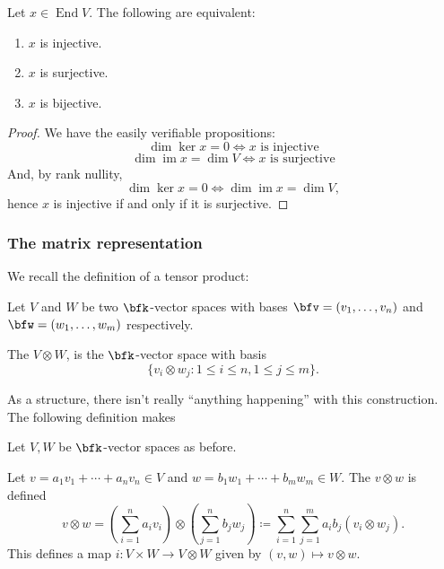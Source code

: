 \documentclass{article}
\DeclareMathOperator{\End}{End}
\DeclareMathOperator{\im}{im}
\begin{document}
\begin{corollary}
    Let $x \in \End V$.
    The following are equivalent:
    \begin{enumerate}[label=(\alph*)]
        \item
            $x$ is injective.
        \item
            $x$ is surjective.
        \item
            $x$ is bijective.
    \end{enumerate}
\end{corollary}

\begin{proof}
    We have the easily verifiable propositions:
    \[
        \dim \ker x = 0 \iff x \text{ is injective}
    \]
    \[
        \dim \im x = \dim V \iff x \text{ is surjective}
    \]
    And, by rank nullity,
    \[
        \dim \ker x = 0
        \iff
        \dim \im x = \dim V,
    \]
    hence $x$ is injective if and only if it is surjective.
\end{proof}

\subsubsection{The matrix representation}

We recall the definition of a tensor product:

\begin{definition}
    Let $V$ and $W$ be two $\bfk$-vector spaces with bases $\bfv = (v_1,\ldots,v_n)$ and $\bfw = (w_1,\ldots,w_m)$ respectively.

    The  $V \otimes W$, is the $\bfk$-vector space with basis
    \[
        \Big\{
            v_i \otimes w_j: 1 \leq i \leq n, 1 \leq j \leq m
        \Big\}.
    \]
\end{definition}

As a structure, there isn't really ``anything happening'' with this construction.
The following definition makes 

\begin{definition}
    Let $V, W$ be $\bfk$-vector spaces as before.

    Let $v = a_1v_1 + \cdots + a_nv_n \in V$ and $w = b_1w_1 + \cdots + b_mw_m \in W$.
    The  $v \otimes w$ is defined 
    \[
        v \otimes w
        =
        \left(
            \sum_{i=1}^n
            a_iv_i
        \right)
        \otimes
        \left(
            \sum_{j=1}^n
            b_jw_j
        \right)
        \coloneq
        \sum_{i=1}^n
        \sum_{j=1}^m
        a_ib_j (v_i \otimes w_j).
    \]
    This defines a map $i: V \times W \to V \otimes W$ given by $(v, w) \mapsto v \otimes w$.
\end{definition}
\end{document}
